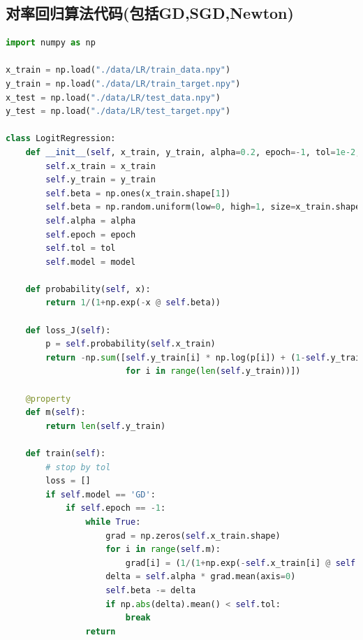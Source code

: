 \documentclass[UTF8]{article}
\begin{document}
\subsection{对率回归算法代码(包括GD,SGD,Newton)}
\begin{lstlisting}[language=python, caption=对率回归算法代码]
import numpy as np

x_train = np.load("./data/LR/train_data.npy")
y_train = np.load("./data/LR/train_target.npy")
x_test = np.load("./data/LR/test_data.npy")
y_test = np.load("./data/LR/test_target.npy")

class LogitRegression:
    def __init__(self, x_train, y_train, alpha=0.2, epoch=-1, tol=1e-2, model='GD'):
        self.x_train = x_train
        self.y_train = y_train
        self.beta = np.ones(x_train.shape[1])
        self.beta = np.random.uniform(low=0, high=1, size=x_train.shape[1])
        self.alpha = alpha
        self.epoch = epoch
        self.tol = tol
        self.model = model
        
    def probability(self, x):
        return 1/(1+np.exp(-x @ self.beta))
    
    def loss_J(self):
        p = self.probability(self.x_train)
        return -np.sum([self.y_train[i] * np.log(p[i]) + (1-self.y_train[i]) * np.log(p[i])
                        for i in range(len(self.y_train))])
    
    @property
    def m(self):
        return len(self.y_train)
    
    def train(self):
        # stop by tol
        loss = []
        if self.model == 'GD':
            if self.epoch == -1:
                while True:
                    grad = np.zeros(self.x_train.shape)
                    for i in range(self.m):
                        grad[i] = (1/(1+np.exp(-self.x_train[i] @ self.beta)) - self.y_train[i]) * self.x_train[i]
                    delta = self.alpha * grad.mean(axis=0)
                    self.beta -= delta
                    if np.abs(delta).mean() < self.tol:
                        break
                return


\end{lstlisting}
\end{document}
